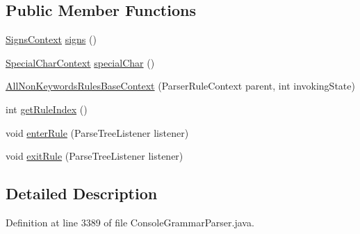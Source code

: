 \subsection*{Public Member Functions}
\begin{DoxyCompactItemize}
\item 
\hyperlink{classgov_1_1nasa_1_1jpf_1_1inspector_1_1client_1_1parser_1_1_console_grammar_parser_1_1_signs_context}{Signs\+Context} \hyperlink{classgov_1_1nasa_1_1jpf_1_1inspector_1_1client_1_1parser_1_1_console_grammar_parser_1_1_all_non_keywords_rules_base_context_ad80ac7c918af5a7c86475d188aa411a0}{signs} ()
\item 
\hyperlink{classgov_1_1nasa_1_1jpf_1_1inspector_1_1client_1_1parser_1_1_console_grammar_parser_1_1_special_char_context}{Special\+Char\+Context} \hyperlink{classgov_1_1nasa_1_1jpf_1_1inspector_1_1client_1_1parser_1_1_console_grammar_parser_1_1_all_non_keywords_rules_base_context_a26ccd8d30b9cde5046da759ae98fb050}{special\+Char} ()
\item 
\hyperlink{classgov_1_1nasa_1_1jpf_1_1inspector_1_1client_1_1parser_1_1_console_grammar_parser_1_1_all_non_keywords_rules_base_context_ace1674425538a29e61c7815b6b0f7b30}{All\+Non\+Keywords\+Rules\+Base\+Context} (Parser\+Rule\+Context parent, int invoking\+State)
\item 
int \hyperlink{classgov_1_1nasa_1_1jpf_1_1inspector_1_1client_1_1parser_1_1_console_grammar_parser_1_1_all_non_keywords_rules_base_context_a33ae74b62f5e2c8e8da13e3110dc1458}{get\+Rule\+Index} ()
\item 
void \hyperlink{classgov_1_1nasa_1_1jpf_1_1inspector_1_1client_1_1parser_1_1_console_grammar_parser_1_1_all_non_keywords_rules_base_context_a4d34e0ecf6aee59532839165540ecd0f}{enter\+Rule} (Parse\+Tree\+Listener listener)
\item 
void \hyperlink{classgov_1_1nasa_1_1jpf_1_1inspector_1_1client_1_1parser_1_1_console_grammar_parser_1_1_all_non_keywords_rules_base_context_a2cb400193d00019ac018a56bbdc3cd6c}{exit\+Rule} (Parse\+Tree\+Listener listener)
\end{DoxyCompactItemize}


\subsection{Detailed Description}


Definition at line 3389 of file Console\+Grammar\+Parser.\+java.



